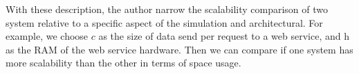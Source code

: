 With these description, the author narrow the scalability comparison of two system relative to a specific aspect of the simulation and architectural. For example, we choose $c$ as the size of data send per request to a web service, and h as the RAM of the web service hardware. Then we can compare if one system has more scalability than the other in terms of space usage. 



















